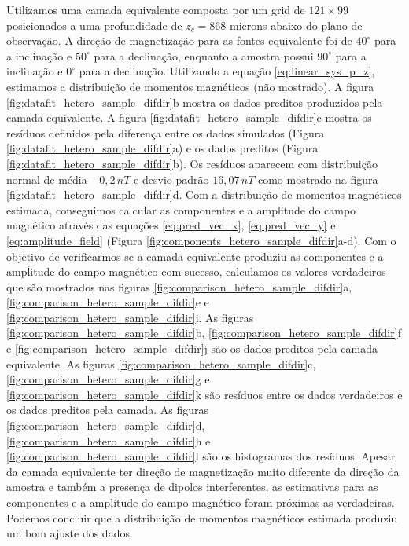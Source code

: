 Utilizamos uma camada equivalente composta por um grid de $121 \times 99$ posicionados a uma profundidade de $z_c = 868$ microns abaixo do plano de observação. A direção de magnetização para as fontes equivalente foi de $40^\circ$ para a inclinação e $50^\circ$ para a declinação, enquanto a amostra possui $90^\circ$ para a inclinação e $0^\circ$ para a declinação. Utilizando a equação \ref{eq:linear_sys_p_z}, estimamos a distribuição de momentos magnéticos (não mostrado). A figura \ref{fig:datafit_hetero_sample_difdir}b mostra os dados preditos produzidos pela camada equivalente. A figura \ref{fig:datafit_hetero_sample_difdir}c mostra os resíduos definidos pela diferença entre os dados simulados (Figura \ref{fig:datafit_hetero_sample_difdir}a) e os dados preditos (Figura \ref{fig:datafit_hetero_sample_difdir}b). Os resíduos aparecem com distribuição normal de média $-0,2 \, nT$ e desvio padrão $16,07 \, nT$ como mostrado na figura \ref{fig:datafit_hetero_sample_difdir}d. Com a distribuição de momentos magnéticos estimada, conseguimos calcular as componentes e a amplitude do campo magnético através das equações \ref{eq:pred_vec_x}, \ref{eq:pred_vec_y} e \ref{eq:amplitude_field} (Figura \ref{fig:components_hetero_sample_difdir}a-d). Com o objetivo de verificarmos se a camada equivalente produziu as componentes e a ampĺitude do campo magnético com sucesso, calculamos os valores verdadeiros que são mostrados nas  figuras \ref{fig:comparison_hetero_sample_difdir}a, \ref{fig:comparison_hetero_sample_difdir}e e \ref{fig:comparison_hetero_sample_difdir}i. As figuras \ref{fig:comparison_hetero_sample_difdir}b, \ref{fig:comparison_hetero_sample_difdir}f e \ref{fig:comparison_hetero_sample_difdir}j são os dados preditos pela camada equivalente. As figuras \ref{fig:comparison_hetero_sample_difdir}c, \ref{fig:comparison_hetero_sample_difdir}g e \ref{fig:comparison_hetero_sample_difdir}k são resíduos entre os dados verdadeiros e os dados preditos pela camada. As figuras \ref{fig:comparison_hetero_sample_difdir}d, \ref{fig:comparison_hetero_sample_difdir}h e \ref{fig:comparison_hetero_sample_difdir}l são os histogramas dos resíduos. Apesar da camada equivalente ter direção de magnetização muito diferente da direção da amostra e também a presença de dipolos interferentes, as estimativas para as componentes e a amplitude do campo magnético foram próximas as verdadeiras. Podemos concluir que a distribuição de momentos magnéticos estimada produziu um bom ajuste dos dados.   


